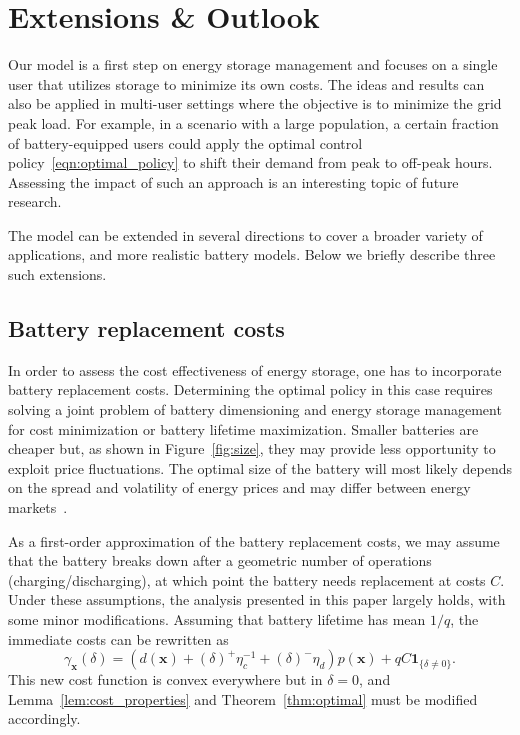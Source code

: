 \documentclass[journal]{IEEEtran}
\newcommand{\bfx}{\boldsymbol x}
\newcommand\1{\mathbf{1}}
\newcommand{\indi}[1]{\1_{\{#1\}}}
\begin{document}
\section{Extensions \& Outlook}\label{sec:outlook}

Our model is a first step on energy storage management and focuses on a single user that utilizes storage to minimize its own costs.  The ideas and results can also be applied in multi-user settings where the objective is to minimize the grid peak load. For example, in a scenario with a large population, a certain fraction of battery-equipped users could apply the optimal control policy~\eqref{eqn:optimal_policy} to shift their demand from peak to off-peak hours.  Assessing the impact of such an approach is an interesting topic of future research.

The model can be extended in several directions to cover a broader variety of applications, and more realistic battery models. Below we briefly describe three such extensions.


\subsection{Battery replacement costs}
In order to assess the cost effectiveness of energy storage, one has to incorporate battery replacement costs. Determining the optimal policy in this case requires solving a joint problem of battery dimensioning and energy storage management for cost minimization or battery lifetime maximization.  Smaller batteries are cheaper but, as shown in Figure~\ref{fig:size}, they may provide less opportunity to exploit price fluctuations. The optimal size of the battery will most likely depends on the spread and volatility of energy prices and may differ between energy markets~\cite{LF06}.

As a first-order approximation of the battery replacement costs, we may assume that the battery breaks down after a geometric number of operations (charging/discharging), at which point the battery needs replacement at costs $C$. Under these assumptions, the analysis presented in this paper largely holds, with some minor modifications. Assuming that battery lifetime has mean $1/q$, the immediate costs can be rewritten as
\begin{equation*}
\gamma_{\bfx}(\delta) = (d(\bfx) + (\delta)^+ \eta_c^{-1} + (\delta)^- \eta_d) p(\bfx) + q C \indi{\delta \neq 0}.
\end{equation*}
This new cost function is convex everywhere but in $\delta = 0$, and Lemma~\ref{lem:cost_properties} and Theorem~\ref{thm:optimal} must be modified accordingly.
\end{document}
